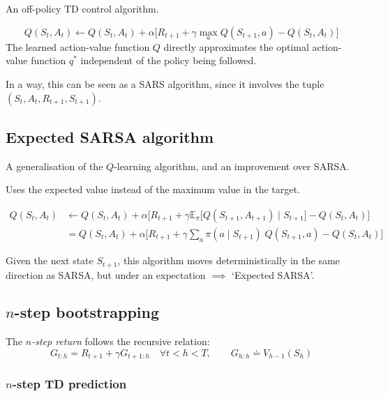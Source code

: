 An off-policy TD control algorithm.

\begin{equation}
    Q(S_t, A_t) \leftarrow Q(S_t, A_t) + \alpha \Big[ R_{t+1} + \gamma \max_{a} Q(S_{t+1}, a) - Q(S_t, A_t) \Big]
\end{equation}
The learned action-value function \( Q \) directly approximates the optimal action-value function \( q^* \) independent of the policy being followed.

In a way, this can be seen as a SARS algorithm, since it involves the tuple \( (S_t, A_t, R_{t+1}, S_{t+1}) \).

\subsection{Expected SARSA algorithm}

A generalisation of the \( Q \)-learning algorithm, and an improvement over SARSA.\@

Uses the expected value instead of the maximum value in the target.

\begin{equation}
    \begin{aligned}
        Q(S_t, A_t)
         & \leftarrow
        Q(S_t, A_t) + \alpha \Big[ R_{t+1} + \gamma \mathbb{E}_{\pi} \big[ Q(S_{t+1}, A_{t+1}) \;\big|\; S_{t+1} \big] - Q(S_t, A_t) \Big]
        \\ & =
        Q(S_t, A_t) + \alpha \Big[ R_{t+1} + \gamma \sum_{a} \pi(a \mid S_{t+1}) \; Q(S_{t+1}, a) - Q(S_t, A_t) \Big]
    \end{aligned}
\end{equation}

Given the next state \( S_{t+1} \), this algorithm moves deterministically in the same direction as SARSA, but under an expectation \( \implies \) `Expected SARSA'.

\subsection{\texorpdfstring{\( n \)}{ (n) }-step bootstrapping}

The \textit{\( n \)-step return} follows the recursive relation:
\begin{equation}
    G_{t:h} = R_{t+1} + \gamma G_{t+1:h}
    \quad \forall t < h < T
    , \qquad
    G_{h:h} \doteq V_{h-1}(S_h)
\end{equation}

\subsubsection{\texorpdfstring{\( n \)}{ (n) }-step TD prediction}

